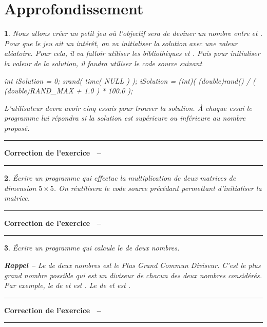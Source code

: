 \documentclass[a4paper]{article}
\newenvironment{Correction}{\par\tiny\blue\rule[1ex]{\textwidth}{1pt}\par\normalsize\textbf{\sffamily{}Correction de l'exercice~\theExo{} -- }}{\par\tiny\blue\rule[1ex]{\textwidth}{1pt}\par}
\newtheorem{Exo}{{\sffamily{Exercice}}}
\begin{document}
	\section{Approfondissement}
		\begin{Exo}
			Nous allons créer un petit jeu où l'objectif sera de deviner un nombre entre  et .
			Pour que le jeu ait un intérêt, on va initialiser la solution avec une valeur aléatoire.
			Pour cela, il va falloir utiliser les bibliothèques  et .
			Puis pour initialiser la valeur de la solution, il faudra utiliser le code source suivant
			\begin{Code*}
int iSolution = 0;
srand( time( NULL ) );
iSolution = (int)( (double)rand() / ( (double)RAND_MAX + 1.0 ) * 100.0 );
			\end{Code*}
			L'utilisateur devra avoir cinq essais pour trouver la solution.
			À chaque essai le programme lui répondra si la solution est supérieure ou inférieure au nombre proposé.
		\end{Exo}
		\begin{Correction}
		\end{Correction}
		\begin{Exo}
			Écrire un programme qui effectue la multiplication de deux matrices de dimension $5\times 5$.
			On réutilisera le code source précédant permettant d'initialiser la matrice.
		\end{Exo}
		\begin{Correction}
		\end{Correction}
		\begin{Exo}
			Écrire un programme qui calcule le  de deux nombres.

			\textbf{Rappel --} Le  de deux nombres est le Plus Grand Commun Diviseur.
			C'est le plus grand nombre possible qui est un diviseur de chacun des deux nombres considérés.
			Par exemple, le  de  et  est .
			Le  de  et  est .
		\end{Exo}
		\begin{Correction}
		\end{Correction}
\end{document}
